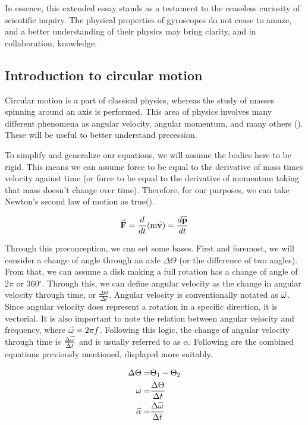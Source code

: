 \documentclass{article}
\newcommand{\myvect}[1]{\accentset{\rightharpoonup}{#1}}
\begin{document}
In essence, this extended essay stands as a testament to the ceaseless curiosity of scientific inquiry. The physical properties of gyroscopes do not cease to amaze, and a better understanding of their physics may bring clarity, and in collaboration, knowledge.

\pagebreak
\subsection{Introduction to circular motion}
Circular motion is a part of classical physics, whereas the study of masses spinning around an axis is performed. This area of physics involves many different phenomena as angular velocity, angular momentum, and many others (\cite{precession,angularvelocity,momentofinertia}). These will be useful to better understand precession.

To simplify and generalize our equations, we will assume the bodies here to be rigid. This means we can assume force to be equal to the derivative of mass times velocity against time (or force to be equal to the derivative of momentum taking that mass doesn't change over time). Therefore, for our purposes, we can take Newton's second law of motion as true(\cite{angularvelocity}).

\begin{equation}
    \myvect{\text{\textbf{F}}}=\frac{d}{dt}(\text{m}\myvect{\text{\textbf{v}}})=\frac{d\myvect{\text{\textbf{p}}}}{dt}
\end{equation}

Through this preconception, we can set some bases. First and foremost, we will consider a change of angle through an axle $\Delta\Theta$ (or the difference of two angles). From that, we can assume a disk making a full rotation has a change of angle of 2$\pi$ or 360$^{\circ}$. Through this, we can define angular velocity as the change in angular velocity through time, or $\frac{\Delta\Theta}{\Delta t}$. Angular velocity is conventionally notated as $\myvect{\omega}$. Since angular velocity does represent a rotation in a specific direction, it is vectorial. It is also important to note the relation between angular velocity and frequency, where $\myvect{\omega}=2\pi f$. Following this logic, the change of angular velocity through time is $\frac{\Delta\myvect{\omega}}{\Delta t}$ and is usually referred to as $\alpha$. Following are the combined equations previously mentioned, displayed more suitably.

\begin{equation*}
\begin{aligned}
    \Delta\Theta =& \Theta_1 - \Theta_2\\
    \omega =& \frac{\Delta\Theta}{\Delta t}\\
    \myvect{\alpha} =& \frac{\Delta\myvect{\omega}}{\Delta t}\\
\end{aligned}
\end{equation*}
\end{document}
